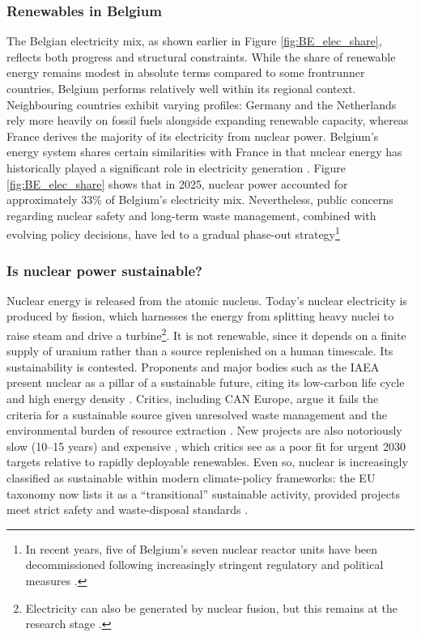 \subsubsection*{Renewables in Belgium}
The Belgian electricity mix, as shown earlier in Figure \ref{fig:BE_elec_share}, reflects both progress and structural constraints. While the share of renewable energy remains modest in absolute terms compared to some frontrunner countries, Belgium performs relatively well within its regional context. Neighbouring countries exhibit varying profiles: Germany and the Netherlands rely more heavily on fossil fuels alongside expanding renewable capacity, whereas France derives the majority of its electricity from nuclear power. Belgium’s energy system shares certain similarities with France in that nuclear energy has historically played a significant role in electricity generation \cite{NuclearPowerBelgium}. Figure \ref{fig:BE_elec_share} shows that in 2025, nuclear power accounted for approximately 33\% of Belgium’s electricity mix. Nevertheless, public concerns regarding nuclear safety and long-term waste management, combined with evolving policy decisions, have led to a gradual phase-out strategy\footnote{In recent years, five of Belgium’s seven nuclear reactor units have been decommissioned following increasingly stringent regulatory and political measures \cite{NuclearPowerBelgium}.} 

\subsubsection*{Is nuclear power sustainable?}
Nuclear energy is released from the atomic nucleus. Today's nuclear electricity is produced by fission, which harnesses the energy from splitting heavy nuclei to raise steam and drive a turbine\footnote{Electricity can also be generated by nuclear fusion, but this remains at the research stage \cite{WhatNuclearFusion2023}.}. It is not renewable, since it depends on a finite supply of uranium rather than a source replenished on a human timescale. Its sustainability is contested. Proponents and major bodies such as the IAEA present nuclear as a pillar of a sustainable future, citing its low-carbon life cycle and high energy density \cite{FiveReasonsClean2026}. Critics, including CAN Europe, argue it fails the criteria for a sustainable source given unresolved waste management and the environmental burden of resource extraction \cite{c.dascaluPOSITIONPAPERNuclear2024}. New projects are also notoriously slow (10–15 years) and expensive \cite{StorageDisposalRadioactive, CanNuclearPower}, which critics see as a poor fit for urgent 2030 targets relative to rapidly deployable renewables. Even so, nuclear is increasingly classified as sustainable within modern climate-policy frameworks: the EU taxonomy now lists it as a ``transitional'' sustainable activity, provided projects meet strict safety and waste-disposal standards \cite{EUTaxonomySustainable}.

